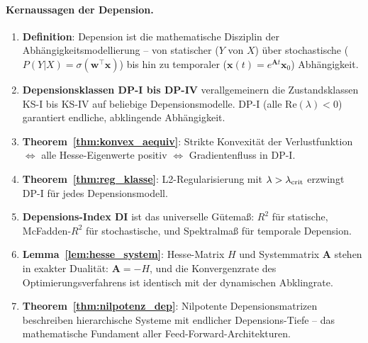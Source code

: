 ﻿\documentclass[12pt, a4paper]{article}
\theoremstyle{definition}
\theoremstyle{remark}
\newcommand{\sigmoid}{\sigma}
\newcommand{\vw}{\bm{w}}
\newcommand{\vx}{\bm{x}}
\newcommand{\vA}{\bm{A}}
\newcommand{\T}{\top}
\newcommand{\re}{\mathrm{Re}}
\begin{document}
\paragraph*{Kernaussagen der Depension.}
\begin{enumerate}[label=(\arabic*), leftmargin=1.5em]
  \item \textbf{Definition}: Depension ist die mathematische Disziplin der
    Abhängigkeitsmodellierung -- von statischer ($Y$ von $X$) über stochastische
    ($P(Y|X) = \sigmoid(\vw^\T\vx)$) bis hin zu temporaler ($\vx(t) = e^{\vA t}\vx_0$)
    Abhängigkeit.

  \item \textbf{Depensionsklassen DP-I bis DP-IV} verallgemeinern die Zustandsklassen
    KS-I bis KS-IV auf beliebige Depensionsmodelle. DP-I (alle $\re(\lambda)<0$)
    garantiert endliche, abklingende Abhängigkeit.

  \item \textbf{Theorem~\ref{thm:konvex_aequiv}}: Strikte Konvexität der Verlustfunktion
    $\Leftrightarrow$ alle Hesse-Eigenwerte positiv $\Leftrightarrow$
    Gradientenfluss in DP-I.

  \item \textbf{Theorem~\ref{thm:reg_klasse}}: L2-Regularisierung mit
    $\lambda > \lambda_{\rm crit}$ erzwingt DP-I für jedes Depensionsmodell.

  \item \textbf{Depensions-Index DI} ist das universelle Gütemaß: $R^2$ für
    statische, McFadden-$R^2$ für stochastische, und Spektralmaß für temporale
    Depension.

  \item \textbf{Lemma~\ref{lem:hesse_system}}: Hesse-Matrix $H$ und Systemmatrix
    $\vA$ stehen in exakter Dualität: $\vA = -H$, und die Konvergenzrate des
    Opti\-mie\-rungs\-ver\-fah\-rens ist identisch mit der dynamischen Abklingrate.

  \item \textbf{Theorem~\ref{thm:nilpotenz_dep}}: Nilpotente Depensionsmatrizen
    beschreiben hierarchische Systeme mit endlicher Depensions-Tiefe -- das
    mathematische Fundament aller Feed-Forward-Architekturen.
\end{enumerate}
\end{document}

